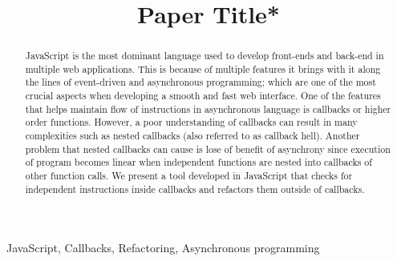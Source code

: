 \documentclass[10pt,conference]{IEEEtran}
\begin{document}
\title{Paper Title*\\
}
\author{
\and
{}
\and
{}
}

\maketitle

\begin{abstract}
JavaScript is the most dominant language used to develop front-ends and back-end in multiple web applications. This is because of multiple features it brings with it along the lines of event-driven and asynchronous programming; which are one of the most crucial aspects when developing a smooth and fast web interface. One of the features that helps maintain flow of instructions in asynchronous language is callbacks or higher order functions. However, a poor understanding of callbacks can result in many complexities such as nested callbacks (also referred to as callback hell). Another problem that nested callbacks can cause is lose of benefit of asynchrony since execution of program becomes linear when independent functions are nested into callbacks of other function calls. We present a tool developed in JavaScript that checks for independent instructions inside callbacks and refactors them outside of callbacks.
\end{abstract}

\begin{IEEEkeywords}
JavaScript, Callbacks, Refactoring, Asynchronous programming
\end{IEEEkeywords}
\end{document}
